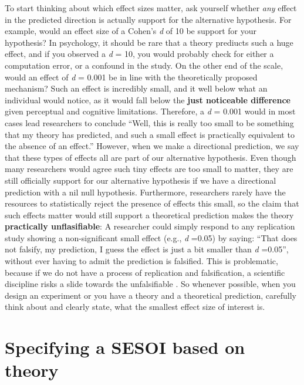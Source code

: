 \documentclass[
  oneside]{book}
\begin{document}
To start thinking about which effect sizes matter, ask yourself whether \emph{any} effect in the predicted direction is actually support for the alternative hypothesis. For example, would an effect size of a Cohen's \emph{d} of 10 be support for your hypothesis? In psychology, it should be rare that a theory prediucts such a huge effect, and if you observed a \emph{d} = 10, you would probably check for either a computation error, or a confound in the study. On the other end of the scale, would an effect of \emph{d} = 0.001 be in line with the theoretically proposed mechanism? Such an effect is incredibly small, and it well below what an individual would notice, as it would fall below the \textbf{just noticeable difference} given perceptual and cognitive limitations. Therefore, a \emph{d} = 0.001 would in most cases lead researchers to conclude ``Well, this is really too small to be something that my theory has predicted, and such a small effect is practically equivalent to the absence of an effect.'' However, when we make a directional prediction, we say that these types of effects all are part of our alternative hypothesis. Even though many researchers would agree such tiny effects are too small to matter, they are still officially support for our alternative hypothesis if we have a directional prediction with a nil null hypothesis. Furthermore, researchers rarely have the resources to statistically reject the presence of effects this small, so the claim that such effects matter would still support a theoretical prediction makes the theory \textbf{practically unflasifiable}: A researcher could simply respond to any replication study showing a non-significant small effect (e.g., \emph{d} =0.05) by saying: ``That does not falsify, my prediction, I guess the effect is just a bit smaller than \emph{d} =0.05'', without ever having to admit the prediction is falsified. This is problematic, because if we do not have a process of replication and falsification, a scientific discipline risks a slide towards the unfalsifiable \citep{ferguson_vast_2012}. So whenever possible, when you design an experiment or you have a theory and a theoretical prediction, carefully think about and clearly state, what the smallest effect size of interest is.

\hypertarget{specifying-a-sesoi-based-on-theory}{%
\section{Specifying a SESOI based on theory}\label{specifying-a-sesoi-based-on-theory}}
\end{document}
